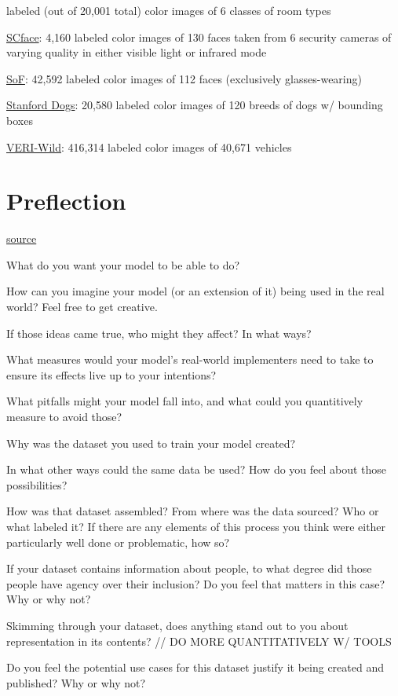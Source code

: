 \documentclass{tufte-handout}
\begin{document}
  labeled (out of 20,001 total) color images of 6 classes of room types
\item
  \href{http://www.scface.org/}{SCface}: 4,160 labeled color images of
  130 faces taken from 6 security cameras of varying quality in either
  visible light or infrared mode
\item
  \href{https://sites.google.com/view/sof-dataset}{SoF}: 42,592 labeled
  color images of 112 faces (exclusively glasses-wearing)
\item
  \href{http://vision.stanford.edu/aditya86/ImageNetDogs/}{Stanford
  Dogs}: 20,580 labeled color images of 120 breeds of dogs w/ bounding
  boxes
\item
  \href{https://github.com/PKU-IMRE/VERI-Wild}{VERI-Wild}: 416,314
  labeled color images of 40,671 vehicles
\ei



\section*{Preflection}
\href{https://www.notion.so/ANN-Project-Framing-76e1b6af347f475a983487996ac9760d}{source}
\bi
\item What do you want your model to be able to do?
\item How can you imagine your model (or an extension of it) being used in the real world? Feel free to get creative.
\item If those ideas came true, who might they affect? In what ways?
\item What measures would your model's real-world implementers need to take to ensure its effects live up to your intentions?
\item What pitfalls might your model fall into, and what could you quantitively measure to avoid those?
\item Why was the dataset you used to train your model created?
\item In what other ways could the same data be used? How do you feel about those possibilities?
\item How was that dataset assembled? From where was the data sourced? Who or what labeled it? If there are any elements of this process you think were either particularly well done or problematic, how so?
\item If your dataset contains information about people, to what degree did those people have agency over their inclusion? Do you feel that matters in this case? Why or why not?
\item Skimming through your dataset, does anything stand out to you about representation in its contents? // DO MORE QUANTITATIVELY W/ TOOLS
\item Do you feel the potential use cases for this dataset justify it being created and published? Why or why not?
\ei
\end{document}

